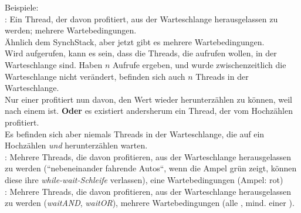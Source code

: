 \noindent
Beispiele:\\

\noindent
{}: Ein Thread, der davon profitiert, aus der Warteschlange herausgelassen zu werden; mehrere Wartebedingungen.\\
Ähnlich dem SynchStack, aber jetzt gibt es mehrere Wartebedingungen.\\
Wird  aufgerufen, kann es sein, dass die Threads, die  aufrufen wollen, in der Warteschlange sind.
Haben $n$ Aufrufe  ergeben, und wurde zwischenzeitlich die Warteschlange nicht verändert, befinden sich auch $n$ Threads in der Warteschlange.\\
Nur einer profitiert nun davon, den Wert wieder herunterzählen zu können, weil  nach einem   ist.
\textbf{Oder} es existiert andersherum ein Thread, der vom Hochzählen profitiert.\\
Es befinden sich aber niemals Threads in der Warteschlange, die auf ein Hochzählen \textit{und} herunterzählen warten.\\

\noindent
{}: Mehrere Threads, die davon profitieren, aus der Warteschlange herausgelassen zu werden (``nebeneinander fahrende Autos``, wenn die Ampel grün zeigt, können diese ihre \textit{while-wait-Schleife} verlassen), eine Wartebedingungen (Ampel: rot)\\

\noindent
{}: Mehrere Threads, die davon profitieren, aus der Warteschlange herausgelassen zu werden (\textit{waitAND}, \textit{waitOR}), mehrere Wartebedingungen (alle , mind. einer ).








